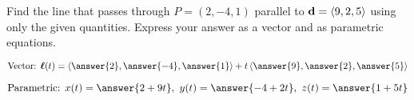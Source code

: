 \documentclass{ximera}
\author{Gregory Hartman \and Matthew Carr}
\begin{document}
\begin{exercise}



Find the line that passes through $P=(2,-4,1)$ parallel to $\mathbf{d}=\left\langle 9,2,5\right\rangle$ using only the given quantities. Express your answer as a vector and as parametric equations.

\begin{prompt}
\[
\text{Vector:  } \vecl(t)=\vector{\answer{2},\answer{-4},\answer{1}}+t\vector{\answer{9},\answer{2},\answer{5}}
\]
\end{prompt}
\begin{prompt}
\[
\text{Parametric:  } x(t)=\answer{2+9t},\ y(t)=\answer{-4+2t},\ z(t)=\answer{1+5t}
\]
\end{prompt}


\end{exercise}
\end{document}
